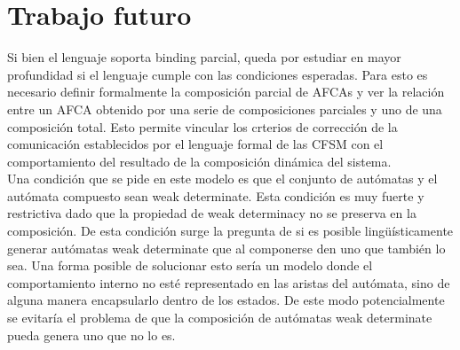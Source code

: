 \section{Trabajo futuro}
Si bien el lenguaje soporta binding parcial, queda por estudiar en mayor profundidad si el lenguaje cumple con las condiciones esperadas. Para esto es necesario definir formalmente la composición parcial de AFCAs y ver la relación entre un AFCA obtenido por una serie de composiciones parciales y uno de una composición total. Esto permite vincular los crterios de corrección de la comunicación establecidos por el lenguaje formal de las CFSM con el comportamiento del resultado de la composición dinámica del sistema. \\
Una condición que se pide en este modelo es que el conjunto de autómatas y el autómata compuesto sean weak determinate. Esta condición es muy fuerte y restrictiva dado que la propiedad de weak determinacy no se preserva en la composición. De esta condición surge la pregunta de si es posible lingüísticamente generar autómatas weak determinate que al componerse den uno que también lo sea. Una forma posible de solucionar esto sería un modelo donde el comportamiento interno no esté representado en las aristas del autómata, sino de alguna manera encapsularlo dentro de los estados. De este modo potencialmente se evitaría el problema de que la composición de autómatas weak determinate pueda genera uno que no lo es.


